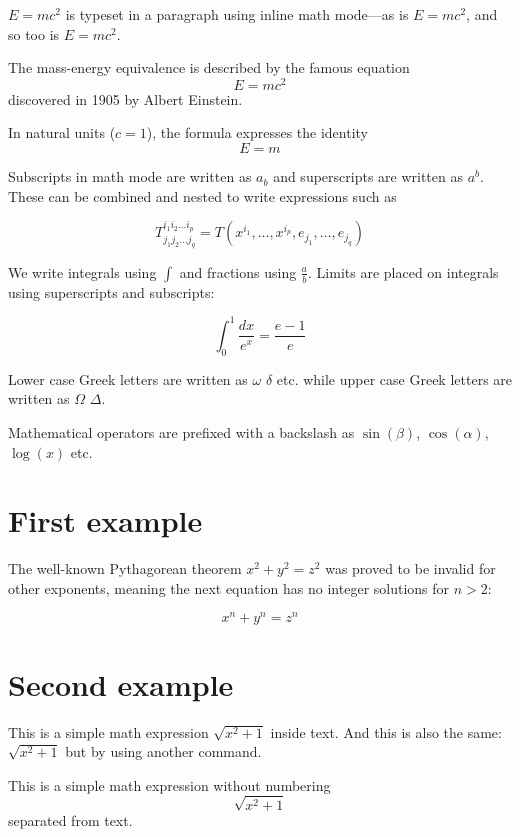 \documentclass{article}
\begin{document}
\begin{math}
    E=mc^2
\end{math} is typeset in a paragraph using inline math mode---as is $E=mc^2$, and so too is \(E=mc^2\).

The mass-energy equivalence is described by the famous equation
\[ E=mc^2 \] discovered in 1905 by Albert Einstein.

In natural units ($c = 1$), the formula expresses the identity
\begin{equation}
    E=m
\end{equation}


Subscripts in math mode are written as $a_b$ and superscripts are written as $a^b$. These can be combined and nested to write expressions such as

\[ T^{i_1 i_2 \dots i_p}_{j_1 j_2 \dots j_q} = T(x^{i_1},\dots,x^{i_p},e_{j_1},\dots,e_{j_q}) \]

We write integrals using $\int$ and fractions using $\frac{a}{b}$. Limits are placed on integrals using superscripts and subscripts:

\[ \int_0^1 \frac{dx}{e^x} =  \frac{e-1}{e} \]

Lower case Greek letters are written as $\omega$ $\delta$ etc. while upper case Greek letters are written as $\Omega$ $\Delta$.

Mathematical operators are prefixed with a backslash as $\sin(\beta)$, $\cos(\alpha)$, $\log(x)$ etc.

\section{First example}

The well-known Pythagorean theorem \(x^2 + y^2 = z^2\) was proved to be invalid for other exponents, meaning the next equation has no integer solutions for \(n>2\):

\[ x^n + y^n = z^n \]

\section{Second example}

This is a simple math expression \(\sqrt{x^2+1}\) inside text.
And this is also the same:
\begin{math}
    \sqrt{x^2+1}
\end{math}
but by using another command.

This is a simple math expression without numbering
\[\sqrt{x^2+1}\]
separated from text.
\end{document}
